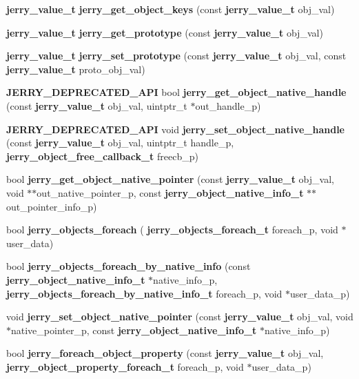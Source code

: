 \begin{DoxyCompactItemize}
\item 
\textbf{ jerry\+\_\+value\+\_\+t} {\bfseries jerry\+\_\+get\+\_\+object\+\_\+keys} (const \textbf{ jerry\+\_\+value\+\_\+t} obj\+\_\+val)
\item 
\textbf{ jerry\+\_\+value\+\_\+t} {\bfseries jerry\+\_\+get\+\_\+prototype} (const \textbf{ jerry\+\_\+value\+\_\+t} obj\+\_\+val)
\item 
\textbf{ jerry\+\_\+value\+\_\+t} {\bfseries jerry\+\_\+set\+\_\+prototype} (const \textbf{ jerry\+\_\+value\+\_\+t} obj\+\_\+val, const \textbf{ jerry\+\_\+value\+\_\+t} proto\+\_\+obj\+\_\+val)
\item 
\textbf{ J\+E\+R\+R\+Y\+\_\+\+D\+E\+P\+R\+E\+C\+A\+T\+E\+D\+\_\+\+A\+PI} bool {\bfseries jerry\+\_\+get\+\_\+object\+\_\+native\+\_\+handle} (const \textbf{ jerry\+\_\+value\+\_\+t} obj\+\_\+val, uintptr\+\_\+t $\ast$out\+\_\+handle\+\_\+p)
\item 
\textbf{ J\+E\+R\+R\+Y\+\_\+\+D\+E\+P\+R\+E\+C\+A\+T\+E\+D\+\_\+\+A\+PI} void {\bfseries jerry\+\_\+set\+\_\+object\+\_\+native\+\_\+handle} (const \textbf{ jerry\+\_\+value\+\_\+t} obj\+\_\+val, uintptr\+\_\+t handle\+\_\+p, \textbf{ jerry\+\_\+object\+\_\+free\+\_\+callback\+\_\+t} freecb\+\_\+p)
\item 
bool {\bfseries jerry\+\_\+get\+\_\+object\+\_\+native\+\_\+pointer} (const \textbf{ jerry\+\_\+value\+\_\+t} obj\+\_\+val, void $\ast$$\ast$out\+\_\+native\+\_\+pointer\+\_\+p, const \textbf{ jerry\+\_\+object\+\_\+native\+\_\+info\+\_\+t} $\ast$$\ast$out\+\_\+pointer\+\_\+info\+\_\+p)
\item 
bool {\bfseries jerry\+\_\+objects\+\_\+foreach} (\textbf{ jerry\+\_\+objects\+\_\+foreach\+\_\+t} foreach\+\_\+p, void $\ast$user\+\_\+data)
\item 
bool {\bfseries jerry\+\_\+objects\+\_\+foreach\+\_\+by\+\_\+native\+\_\+info} (const \textbf{ jerry\+\_\+object\+\_\+native\+\_\+info\+\_\+t} $\ast$native\+\_\+info\+\_\+p, \textbf{ jerry\+\_\+objects\+\_\+foreach\+\_\+by\+\_\+native\+\_\+info\+\_\+t} foreach\+\_\+p, void $\ast$user\+\_\+data\+\_\+p)
\item 
void {\bfseries jerry\+\_\+set\+\_\+object\+\_\+native\+\_\+pointer} (const \textbf{ jerry\+\_\+value\+\_\+t} obj\+\_\+val, void $\ast$native\+\_\+pointer\+\_\+p, const \textbf{ jerry\+\_\+object\+\_\+native\+\_\+info\+\_\+t} $\ast$native\+\_\+info\+\_\+p)
\item 
bool {\bfseries jerry\+\_\+foreach\+\_\+object\+\_\+property} (const \textbf{ jerry\+\_\+value\+\_\+t} obj\+\_\+val, \textbf{ jerry\+\_\+object\+\_\+property\+\_\+foreach\+\_\+t} foreach\+\_\+p, void $\ast$user\+\_\+data\+\_\+p)

\end{DoxyCompactItemize}
